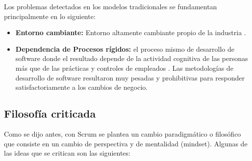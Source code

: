 Los problemas detectados en los modelos tradicionales se fundamentan principalmente en lo siguiente: 

\begin{itemize}

\item \textbf{Entorno cambiante:} Entorno altamente cambiante propio de la industria \cite{Martin-Alaimo-2014}.

\item \textbf{Dependencia de Procesos rígidos:} el proceso mismo de desarrollo de software donde el resultado depende de la actividad
cognitiva de las personas más que de las prácticas y controles de empleados \cite{Martin-Alaimo-2014}. Las metodologías de desarrollo de software resultaron muy pesadas y prohibitivas para responder satisfactoriamente a los cambios de negocio.

\end{itemize}

\subsection{Filosofía criticada}

Como se dijo antes, con Scrum se plantea un cambio paradigmático o filosófico que consiste en un cambio de perspectiva y de mentalidad (mindset). Algunas de las ideas que se critican son las siguientes:

